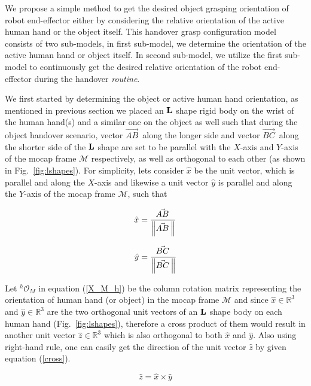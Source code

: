 We propose a simple method to get the desired object grasping orientation of robot end-effector either by considering the relative orientation of the active human hand or the object itself. This handover grasp configuration model consists of two sub-models, in first sub-model, we determine the orientation of the active human hand or object itself. In second sub-model, we utilize the first sub-model to continuously get the desired relative orientation of the robot end-effector during the handover \textit{routine}. 



We first started by determining the object or active human hand orientation, as  mentioned in previous section we placed an ${\bf L}$ shape rigid body on the wrist of the human hand(s) and a similar one on the object as well such that during the object handover scenario, vector $\vec{AB}^{\,}$ along the longer side and vector $\vec{BC}^{\,}$ along the shorter side of the ${\bf L}$ shape are set to be parallel with the $X$-axis and $Y$-axis of the mocap frame $\mathcal{M}$ respectively, as well as orthogonal to each other (as shown in Fig.~\ref{fig:lshapes}). For simplicity, lets consider $\hat{x}$ be the unit vector, which is parallel and along the $X$-axis and likewise a unit vector $\hat{y}$ is parallel and along the $Y$-axis of the mocap frame $\mathcal{M}$, such that

\begin{equation*}
\hat{x} = \frac{\vec{AB}^{\,}}{\norm{\vec{AB}^{\,}}}
\end{equation*}

\begin{equation*}
\hat{y} = \frac{\vec{BC}^{\,}}{\norm{\vec{BC}^{\,}}}
\end{equation*}

Let ${}^{h}\mathcal{O}_{M}$ in equation (\ref{X_M_h}) be the column rotation matrix representing the orientation of human hand (or object) in the mocap frame $\mathcal{M}$ and since $\hat{x} \in \mathbb{R}^{3}$ and $\hat{y} \in \mathbb{R}^{3}$ are the two orthogonal unit vectors of an ${\bf L}$ shape body on each human hand (Fig.~\ref{fig:lshapes}), therefore a cross product of them would result in another unit vector $\hat{z} \in \mathbb{R}^{3}$ which is also orthogonal to both $\hat{x}$ and $\hat{y}$. Also using right-hand rule, one can easily get the direction of the unit vector $\hat{z}$ by given equation (\ref{cross}).

\begin{equation}\label{cross}
\hat{z} = \hat{x} \times \hat{y}
\end{equation}

